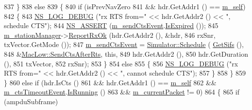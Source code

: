 \begin{DoxyCode}
837         \}
838       \textcolor{keywordflow}{else}
839         \{
840           \textcolor{keywordflow}{if} (isPrevNavZero
841               && hdr.GetAddr1 () == \hyperlink{classns3_1_1MacLow_a23004ca5405c82111f5b20eec03b3d9a}{m\_self})
842             \{
843               \hyperlink{group__logging_ga413f1886406d49f59a6a0a89b77b4d0a}{NS\_LOG\_DEBUG} (\textcolor{stringliteral}{"rx RTS from="} << hdr.GetAddr2 () << \textcolor{stringliteral}{", schedule CTS"});
844               \hyperlink{assert_8h_a6dccdb0de9b252f60088ce281c49d052}{NS\_ASSERT} (\hyperlink{classns3_1_1MacLow_ade35698702b1353f2eff6b97653f8b0e}{m\_sendCtsEvent}.\hyperlink{classns3_1_1EventId_a5c30c92e7c1c34b4e8505cc07ed71b02}{IsExpired} ());
845               \hyperlink{classns3_1_1MacLow_a1c7f45f071f9e5eb97764f64e5cdaf1b}{m\_stationManager}->\hyperlink{classns3_1_1WifiRemoteStationManager_a58e79dd3960c03fdd28ee8c0dde03d8f}{ReportRxOk} (hdr.GetAddr2 (), &hdr,
846                                             rxSnr, txVector.GetMode ());
847               \hyperlink{classns3_1_1MacLow_ade35698702b1353f2eff6b97653f8b0e}{m\_sendCtsEvent} = \hyperlink{classns3_1_1Simulator_a671882c894a08af4a5e91181bf1eec13}{Simulator::Schedule} (
      \hyperlink{classns3_1_1MacLow_a9107421b7ed9f291d60b8344b4918e56}{GetSifs} (),
848                                                     &\hyperlink{classns3_1_1MacLow_aebcd4c3e8d64fb53af1f8a862c766e33}{MacLow::SendCtsAfterRts}, \textcolor{keyword}{this},
849                                                     hdr.GetAddr2 (),
850                                                     hdr.GetDuration (),
851                                                     txVector,
852                                                     rxSnr);
853             \}
854           \textcolor{keywordflow}{else}
855             \{
856               \hyperlink{group__logging_ga413f1886406d49f59a6a0a89b77b4d0a}{NS\_LOG\_DEBUG} (\textcolor{stringliteral}{"rx RTS from="} << hdr.GetAddr2 () << \textcolor{stringliteral}{", cannot schedule CTS"});
857             \}
858         \}
859     \}
860   \textcolor{keywordflow}{else} \textcolor{keywordflow}{if} (hdr.IsCts ()
861            && hdr.GetAddr1 () == \hyperlink{classns3_1_1MacLow_a23004ca5405c82111f5b20eec03b3d9a}{m\_self}
862            && \hyperlink{classns3_1_1MacLow_a1de3cc66dcaa9f318fb1b2cffb108b01}{m\_ctsTimeoutEvent}.\hyperlink{classns3_1_1EventId_aabf8476d1a080c199ea0c6aa9ccea372}{IsRunning} ()
863            && \hyperlink{classns3_1_1MacLow_aa4f81bb523ceed1bbf5a84851b25e29c}{m\_currentPacket} != 0)
864     \{
865       \textcolor{keywordflow}{if} (ampduSubframe)

\end{DoxyCode}
